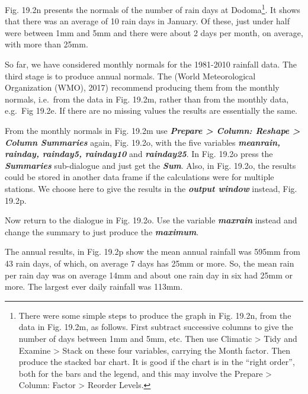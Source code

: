 \documentclass[
  letterpaper,
  DIV=11,
  numbers=noendperiod]{scrreprt}
\begin{document}
Fig. 19.2n presents the normals of the number of rain days at
Dodoma\footnote{There were some simple steps to produce the graph in
  Fig. 19.2n, from the data in Fig. 19.2m, as follows. First subtract
  successive columns to give the number of days between 1mm and 5mm,
  etc. Then use Climatic \textgreater{} Tidy and Examine \textgreater{}
  Stack on these four variables, carrying the Month factor. Then produce
  the stacked bar chart. It is good if the chart is in the ``right
  order'', both for the bars and the legend, and this may involve the
  Prepare \textgreater{} Column: Factor \textgreater{} Reorder Levels.}.
It shows that there was an average of 10 rain days in January. Of these,
just under half were between 1mm and 5mm and there were about 2 days per
month, on average, with more than 25mm.

So far, we have considered monthly normals for the 1981-2010 rainfall
data. The third stage is to produce annual normals. The (World
Meteorological Organization (WMO), 2017) recommend producing them from
the monthly normals, i.e.~from the data in Fig. 19.2m, rather than from
the monthly data, e.g.~Fig 19.2e. If there are no missing values the
results are essentially the same.

From the monthly normals in Fig. 19.2m use \textbf{\emph{Prepare
\textgreater{} Column: Reshape \textgreater{} Column Summaries}} again,
Fig. 19.2o, with the five variables \textbf{\emph{meanrain, rainday,
rainday5, rainday10}} and \textbf{\emph{rainday25}}. In Fig. 19.2o press
the \textbf{\emph{Summaries}} sub-dialogue and just get the
\textbf{\emph{Sum}}. Also, in Fig. 19.2o, the results could be stored in
another data frame if the calculations were for multiple stations. We
choose here to give the results in the \textbf{\emph{output window}}
instead, Fig. 19.2p.

Now return to the dialogue in Fig. 19.2o. Use the variable
\textbf{\emph{maxrain}} instead and change the summary to just produce
the \textbf{\emph{maximum}}.

The annual results, in Fig. 19.2p show the mean annual rainfall was
595mm from 43 rain days, of which, on average 7 days has 25mm or more.
So, the mean rain per rain day was on average 14mm and about one rain
day in six had 25mm or more. The largest ever daily rainfall was 113mm.
\end{document}
